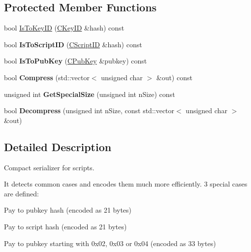 \subsection*{Protected Member Functions}
\begin{DoxyCompactItemize}
\item 
bool \mbox{\hyperlink{class_c_script_compressor_a38e2dcfce62bb157b55536d73748f556}{Is\+To\+Key\+ID}} (\mbox{\hyperlink{class_c_key_i_d}{C\+Key\+ID}} \&hash) const
\item 
\mbox{\label{class_c_script_compressor_a7a995d1064299a58d4f2e9f0ac205d07}} 
bool {\bfseries Is\+To\+Script\+ID} (\mbox{\hyperlink{class_c_script_i_d}{C\+Script\+ID}} \&hash) const
\item 
\mbox{\label{class_c_script_compressor_a19a67455a106e2e0528bc97cb60d2391}} 
bool {\bfseries Is\+To\+Pub\+Key} (\mbox{\hyperlink{class_c_pub_key}{C\+Pub\+Key}} \&pubkey) const
\item 
\mbox{\label{class_c_script_compressor_a563ba251e7720841b4d5fc30ebd736e6}} 
bool {\bfseries Compress} (std\+::vector$<$ unsigned char $>$ \&out) const
\item 
\mbox{\label{class_c_script_compressor_aa702c1ed206804d016da3600e02d2169}} 
unsigned int {\bfseries Get\+Special\+Size} (unsigned int n\+Size) const
\item 
\mbox{\label{class_c_script_compressor_a1feb663ddab3a45218c7cb02f2a25717}} 
bool {\bfseries Decompress} (unsigned int n\+Size, const std\+::vector$<$ unsigned char $>$ \&out)
\end{DoxyCompactItemize}


\subsection{Detailed Description}
Compact serializer for scripts.

It detects common cases and encodes them much more efficiently. 3 special cases are defined\+:
\begin{DoxyItemize}
\item Pay to pubkey hash (encoded as 21 bytes)
\item Pay to script hash (encoded as 21 bytes)
\item Pay to pubkey starting with 0x02, 0x03 or 0x04 (encoded as 33 bytes)
\end{DoxyItemize}

